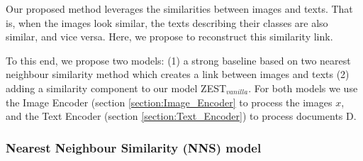 \documentclass[11pt,a4paper]{article}
\newcommand\gal[1]{\textcolor{bright}{\textbf{GAL:} #1 }}
\newcommand\yuval[1]{\textcolor{darkpink}{\textbf{YUVAL:} #1 }}
\begin{document}
Our proposed method leverages the similarities between images and texts. That is, when the  images look similar, the texts describing their classes are also similar, and vice versa. Here, we propose
to reconstruct this similarity  link. 






 To this end, we propose two models: (1) a strong baseline based on two nearest neighbour similarity method  which creates a link between images and texts (2) adding a similarity component to our model ZEST$_{vanilla}$.
For both models we use the Image Encoder (section \ref{section:Image_Encoder} to process the images $x$, and the Text Encoder (section \ref{section:Text_Encoder}) to process documents D.




%
%






\subsubsection{Nearest Neighbour Similarity (NNS) model}
\end{document}
